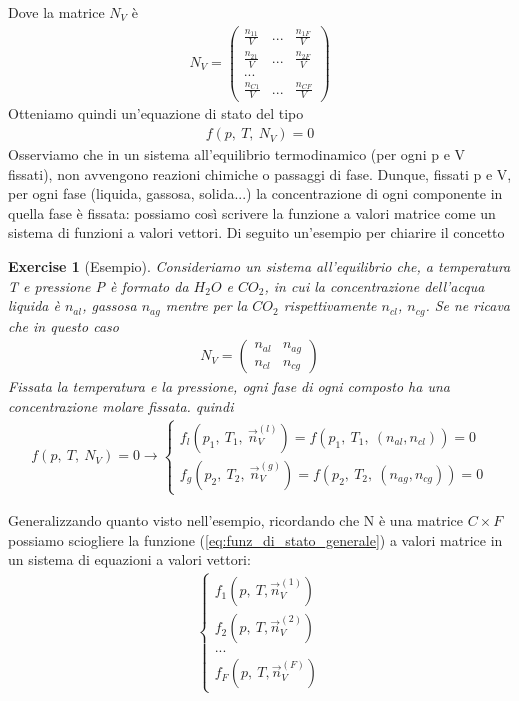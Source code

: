 \documentclass[10pt,a4paper]{article}
\newtheorem{exercise}{Exercise}
\begin{document}
Dove la matrice \(N_V\) è
\begin{align*}
	N_V = \begin{pmatrix}
		\frac{n_{11}}{V}&...&\frac{n_{1F}}{V}\\
		\frac{n_{21}}{V}&...&\frac{n_{2F}}{V}\\
		...&&\\
		\frac{n_{C1}}{V}&...&\frac{n_{CF}}{V}
	\end{pmatrix}
\end{align*}
Otteniamo quindi un'equazione di stato del tipo
\begin{align}\label{eq:funz_di_stato_generale}
	f(p,\ T,\ N_V)= 0
\end{align}
Osserviamo che in un sistema all'equilibrio termodinamico (per ogni p e V fissati), non avvengono reazioni chimiche o passaggi di fase. Dunque, fissati p e V, per ogni fase (liquida, gassosa, solida...) la concentrazione di ogni componente in quella fase è fissata: possiamo così scrivere la funzione a valori matrice come un sistema di funzioni a valori vettori. Di seguito un'esempio per chiarire il concetto
\begin{exercise}[Esempio]
	Consideriamo un sistema all'equilibrio che, a temperatura T e pressione P è formato da \(H_2O\) e \(CO_2\), in cui la concentrazione dell'acqua liquida è \(n_{al}\), gassosa \(n_{ag}\) mentre per la \(CO_2\) rispettivamente \(n_{cl}\), \(n_{cg}\). Se ne ricava che in questo caso
	\begin{align*}
		N_V = \begin{pmatrix}
			n_{al}& n_{ag}\\
			n_{cl}& n_{cg}
		\end{pmatrix}
	\end{align*}
	Fissata la temperatura e la pressione, ogni fase di ogni composto ha una concentrazione molare fissata. quindi
	\begin{align*}
		f(p,\ T,\ N_V)=0 \rightarrow
		\begin{cases}
			f_{l}(p_1,\ T_1,\ \vec{n}_V^{(l)})=f(p_1,\ T_1,\ (n_{al}, n_{cl}))=0\\
			f_{g}(p_2,\ T_2,\ \vec{n}_V^{(g)})=f(p_2,\ T_2,\ (n_{ag}, n_{cg}))=0
		\end{cases}
	\end{align*}
\end{exercise}
Generalizzando quanto visto nell'esempio, ricordando che N è una matrice \(C \times F\) possiamo sciogliere la funzione (\ref{eq:funz_di_stato_generale}) a valori matrice in un sistema di equazioni a valori vettori:
\begin{align*}
	\begin{cases}
		f_1(p,\ T, \vec{n}_V^{(1)})\\
		f_2(p,\ T, \vec{n}_V^{(2)})\\
		...\\
		f_F(p,\ T, \vec{n}_V^{(F)})
	\end{cases}
\end{align*}
\end{document}
